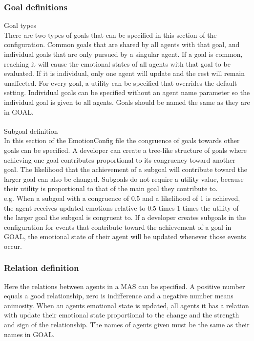 \documentclass[11pt]{article}
\begin{document}
\subsubsection*{Goal definitions}
Goal types\\
There are two types of goals that can be specified in this section of the configuration. Common goals that are shared by all agents with that goal, and individual goals that are only pursued by a singular agent. If a goal is common, reaching it will cause the emotional states of all agents with that goal to be evaluated. If it is individual, only one agent will update and the rest will remain unaffected. For every goal, a utility can be specified that overrides the default setting. Individual goals can be specified without an agent name parameter so the individual goal is given to all agents. Goals should be named the same as they are in GOAL.\\
\\
Subgoal definition\\
In this section of the EmotionConfig\cite{emotionconfig} file the congruence of goals towards other goals can be specified. A developer can create a tree-like structure of goals where achieving one goal contributes proportional to its congruency toward another goal. The likelihood that the achievement of a subgoal will contribute toward the larger goal can also be changed. Subgoals do not require a utility value, because their utility is proportional to that of the main goal they contribute to.\\e.g. When a subgoal with a congruence of 0.5 and a likelihood of 1 is achieved, the agent receives updated emotions relative to 0.5 times 1 times the utility of the larger goal the subgoal is congruent to. If a developer creates subgoals in the configuration for events that contribute toward the achievement of a goal in GOAL, the emotional state of their agent will be updated whenever those events occur.
\subsubsection*{Relation definition}
Here the relations between agents in a MAS can be specified. A positive number equals a good relationship, zero is indifference and a negative number means animosity. When an agents emotional state is updated, all agents it has a relation with update their emotional state proportional to the change and the strength and sign of the relationship. The names of agents given must be the same as their names in GOAL.
\end{document}
